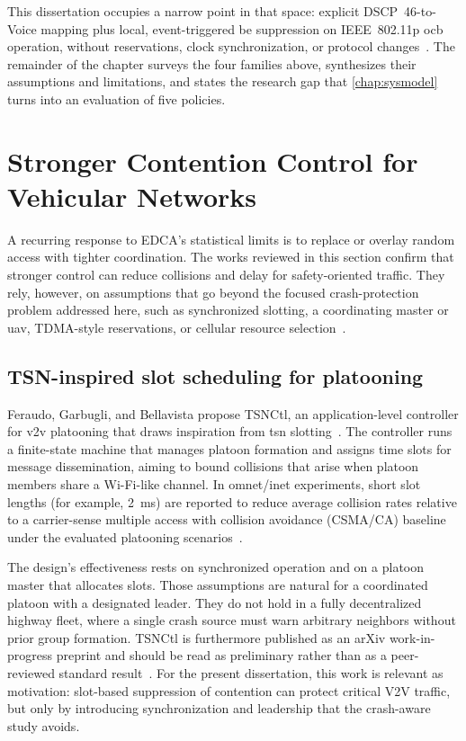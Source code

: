 This dissertation occupies a narrow point in that space: explicit DSCP~46-to-Voice mapping plus local, event-triggered \gls{be} suppression on IEEE~802.11p \gls{ocb} operation, without reservations, clock synchronization, or protocol changes~\cite{jiang2008ieee80211p,IEEE80211}.
The remainder of the chapter surveys the four families above, synthesizes their assumptions and limitations, and states the research gap that \autoref{chap:sysmodel} turns into an evaluation of five policies.

\section{Stronger Contention Control for Vehicular Networks}
\label{sec:rw:stronger}

A recurring response to EDCA's statistical limits is to replace or overlay random access with tighter coordination.
The works reviewed in this section confirm that stronger control can reduce collisions and delay for safety-oriented traffic.
They rely, however, on assumptions that go beyond the focused crash-protection problem addressed here, such as synchronized slotting, a coordinating master or \gls{uav}, TDMA-style reservations, or cellular resource selection~\cite{TSNCtl_Feraudo,PRP_MAC_Li,CFC_MAC_Linn,CV2X_Sidelink_Allocation}.

\subsection{TSN-inspired slot scheduling for platooning}
\label{sec:rw:tsnctl}

Feraudo, Garbugli, and Bellavista propose TSNCtl, an application-level controller for \gls{v2v} platooning that draws inspiration from \gls{tsn} slotting~\cite{TSNCtl_Feraudo}.
The controller runs a finite-state machine that manages platoon formation and assigns time slots for message dissemination, aiming to bound collisions that arise when platoon members share a Wi-Fi-like channel.
In \gls{omnet}/\gls{inet} experiments, short slot lengths (for example, \SI{2}{\milli\second}) are reported to reduce average collision rates relative to a carrier-sense multiple access with collision avoidance (CSMA/CA) baseline under the evaluated platooning scenarios~\cite{TSNCtl_Feraudo}.

The design's effectiveness rests on synchronized operation and on a platoon master that allocates slots.
Those assumptions are natural for a coordinated platoon with a designated leader.
They do not hold in a fully decentralized highway fleet, where a single crash source must warn arbitrary neighbors without prior group formation.
TSNCtl is furthermore published as an arXiv work-in-progress preprint and should be read as preliminary rather than as a peer-reviewed standard result~\cite{TSNCtl_Feraudo}.
For the present dissertation, this work is relevant as motivation: slot-based suppression of contention can protect critical V2V traffic, but only by introducing synchronization and leadership that the crash-aware study avoids.


